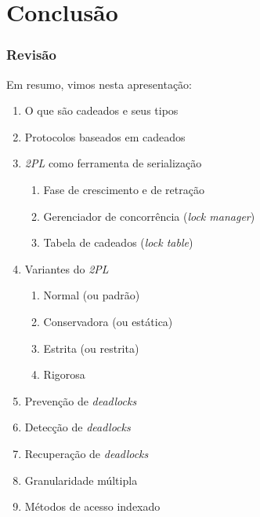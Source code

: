 \documentclass{beamer}
\begin{document}

\section{Conclusão}

\begin{frame} %
    \frametitle{Revisão}
    Em resumo, vimos nesta apresentação:
    
    \begin{enumerate}
        \item O que são cadeados e seus tipos
        \item Protocolos baseados em cadeados
        \item \emph{2PL} como ferramenta de serialização
        \begin{enumerate}
            \item Fase de crescimento e de retração
            \item Gerenciador de concorrência (\emph{lock manager})
            \item Tabela de cadeados (\emph{lock table})
        \end{enumerate}
        \item Variantes do \emph{2PL}
        \begin{enumerate}
            \item Normal (ou padrão)
            \item Conservadora (ou estática)
            \item Estrita (ou restrita)
            \item Rigorosa
        \end{enumerate}
        \item Prevenção de \emph{deadlocks}
        \item Detecção de \emph{deadlocks}
        \item Recuperação de \emph{deadlocks}
        \item Granularidade múltipla
        \item Métodos de acesso indexado
    \end{enumerate}

\end{frame}
\end{document}

